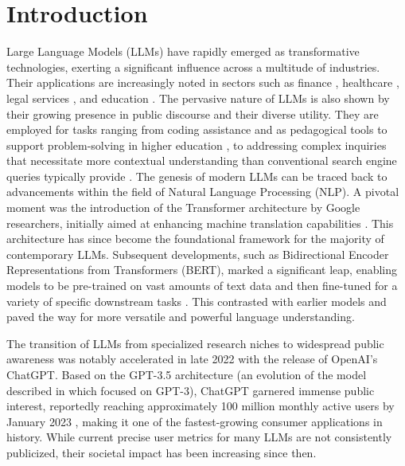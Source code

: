 \section{Introduction}\label{section::introduction}

Large Language Models (LLMs) have rapidly emerged as transformative technologies, exerting a significant influence across a multitude of industries. 
Their applications are increasingly noted in sectors such as finance \cite{dowling2023chatgpt}, healthcare \cite{thirunavukarasu2023large}, legal services \cite{bommarito2022gpt}, and education \cite{kasneci2023chatgpt, 10822885}. 
The pervasive nature of LLMs is also shown by their growing presence in public discourse and their diverse utility. 
They are employed for tasks ranging from coding assistance \cite{shu2024llms} and as pedagogical tools to support problem-solving in higher education \cite{10.1145/3657604.3662036}, to addressing complex inquiries that necessitate more contextual understanding than conventional search engine queries typically provide \cite{liu2024llm}.
The genesis of modern LLMs can be traced back to advancements within the field of Natural Language Processing (NLP). A pivotal moment was the introduction of the Transformer architecture by Google researchers, initially aimed at enhancing machine translation capabilities \cite{vaswani2017attention}. This architecture has since become the foundational framework for the majority of contemporary LLMs. Subsequent developments, such as Bidirectional Encoder Representations from Transformers (BERT), marked a significant leap, enabling models to be pre-trained on vast amounts of text data and then fine-tuned for a variety of specific downstream tasks \cite{devlin2018bert}. This contrasted with earlier models and paved the way for more versatile and powerful language understanding.

The transition of LLMs from specialized research niches to widespread public awareness was notably accelerated in late 2022 with the release of OpenAI's ChatGPT. Based on the GPT-3.5 architecture (an evolution of the model described in \cite{brown2020languagemodelsfewshotlearners} which focused on GPT-3), ChatGPT garnered immense public interest, reportedly reaching approximately 100 million monthly active users by January 2023 \cite{hu_chatgpt_2023, 10113601}, making it one of the fastest-growing consumer applications in history. While current precise user metrics for many LLMs are not consistently publicized, their societal impact has been increasing since then.

